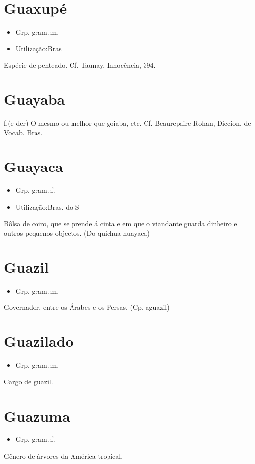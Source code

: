 \section{Guaxupé}
\begin{itemize}
\item {Grp. gram.:m.}
\end{itemize}
\begin{itemize}
\item {Utilização:Bras}
\end{itemize}
Espécie de penteado. Cf. Taunay, \textunderscore Innocência\textunderscore , 394.
\section{Guayaba}
\textunderscore f.\textunderscore  (e der)
O mesmo ou melhor que \textunderscore goiaba\textunderscore , etc. Cf. Beaurepaire-Rohan, \textunderscore Diccion. de Vocab. Bras\textunderscore .
\section{Guayaca}
\begin{itemize}
\item {Grp. gram.:f.}
\end{itemize}
\begin{itemize}
\item {Utilização:Bras. do S}
\end{itemize}
Bôlsa de coiro, que se prende á cinta e em que o viandante guarda dinheiro e outros pequenos objectos.
(Do quichua \textunderscore huayaca\textunderscore )
\section{Guazil}
\begin{itemize}
\item {Grp. gram.:m.}
\end{itemize}
Governador, entre os Árabes e os Persas.
(Cp. \textunderscore aguazil\textunderscore )
\section{Guazilado}
\begin{itemize}
\item {Grp. gram.:m.}
\end{itemize}
Cargo de guazil.
\section{Guazuma}
\begin{itemize}
\item {Grp. gram.:f.}
\end{itemize}
Gênero de árvores da América tropical.
